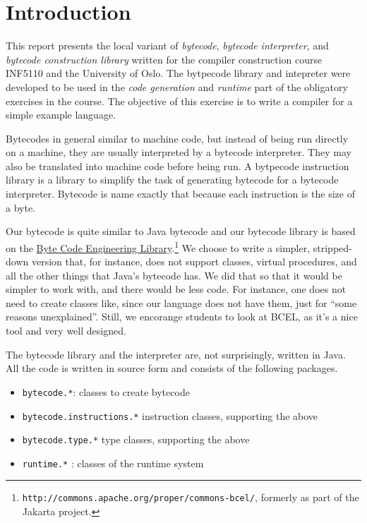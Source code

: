 \documentclass[11pt]{article}
\author{Martin Steffen}
\date{\today}
\title{}
\begin{document}
\tableofcontents


\section{Introduction}
\label{sec:org5e4b714}

This report presents the local variant of \emph{bytecode}, \emph{bytecode
interpreter}, and \emph{bytecode construction library} written for the compiler
construction course INF5110 and the University of Oslo. The bytpecode
library and intepreter were developed to be used in the \emph{code generation}
and \emph{runtime} part of the obligatory exercises in the course. The objective
of this exercise is to write a compiler for a simple example language.


Bytecodes in general similar to machine code, but instead of being run
directly on a machine, they are usually interpreted by a bytecode
interpreter. They may also be translated into machine code before being
run. A bytpecode instruction library is a library to simplify the task of
generating bytecode for a bytecode interpreter. Bytecode is name exactly
that because each instruction is the size of a byte.

Our bytecode is quite similar to Java bytecode and our bytecode library is
based on the \href{http://commons.apache.org/proper/commons-bcel/}{Byte Code Engineering Library}.\footnote{\texttt{http://commons.apache.org/proper/commons-bcel/}, formerly as
part of the Jakarta project.} We choose to write a
simpler, stripped-down version that, for instance, does not support
classes, virtual procedures, and all the other things that Java's bytecode
has. We did that so that it would be simpler to work with, and there would
be less code. For instance, one does not need to create classes like, since
our language does not have them, just for ``some reasons
unexplained''. Still, we encorange students to look at BCEL, as it's a nice
tool and very well designed.




The bytecode library and the interpreter are, not surprisingly, written in
Java. All the code is written in source form and consists of the following
packages.

\begin{itemize}
\item \texttt{bytecode.*}:    classes to create bytecode
\item \texttt{bytecode.instructions.*}  instruction classes, supporting the above
\item \texttt{bytecode.type.*}  type classes, supporting the above
\item \texttt{runtime.*} : classes of the runtime system
\end{itemize}
\end{document}
